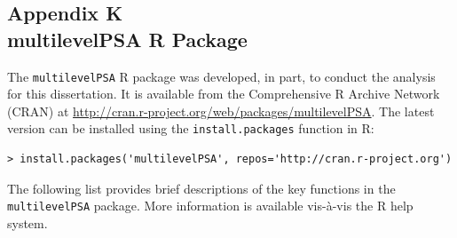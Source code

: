 \documentclass[letterpaper,12p,twoside]{article} %
\begin{document}
\clearpage
{}
\subsection*{Appendix K\\multilevelPSA R Package}
\label{multilevelPSAPackage}

The \texttt{multilevelPSA} R package was developed, in part, to conduct the analysis for this dissertation. It is available from the Comprehensive R Archive Network (CRAN) at \url{http://cran.r-project.org/web/packages/multilevelPSA}. The latest version can be installed using the \texttt{install.packages} function in R:

\begin{verbatim}
> install.packages('multilevelPSA', repos='http://cran.r-project.org')
\end{verbatim}

The following list provides brief descriptions of the key functions in the \texttt{multilevelPSA} package. More information is available vis-\`a-vis the R help system.
\end{document}
